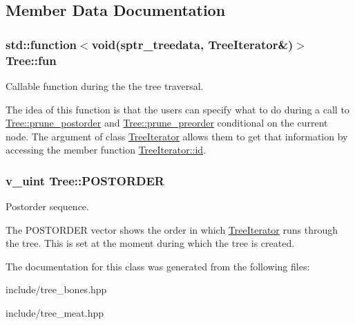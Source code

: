 \subsection{Member Data Documentation}
\subsubsection[{\texorpdfstring{fun}{fun}}]{\setlength{\rightskip}{0pt plus 5cm}std\+::function$<$void(sptr\+\_\+treedata, {\bf Tree\+Iterator}\&)$>$ Tree\+::fun}\hypertarget{classTree_ad98f51efc931f96c687c65d4387d19e9}{}\label{classTree_ad98f51efc931f96c687c65d4387d19e9}


Callable function during the the tree traversal. 

The idea of this function is that the users can specify what to do during a call to \hyperlink{classTree_a7d465880d18acf79f3a772ea5412b0d7}{Tree\+::prune\+\_\+postorder} and \hyperlink{classTree_ac85bfb083b3856e65987e1d15885a61c}{Tree\+::prune\+\_\+preorder} conditional on the current node. The argument of class \hyperlink{classTreeIterator}{Tree\+Iterator} allows them to get that information by accessing the member function \hyperlink{classTreeIterator_a80badcbb276e0aa78216f5ef6ff91b62}{Tree\+Iterator\+::id}. 
\subsubsection[{\texorpdfstring{P\+O\+S\+T\+O\+R\+D\+ER}{POSTORDER}}]{\setlength{\rightskip}{0pt plus 5cm}v\+\_\+uint Tree\+::\+P\+O\+S\+T\+O\+R\+D\+ER\hspace{0.3cm}{\ttfamily [protected]}}\hypertarget{classTree_a310e76b803db38e7067514822b21a58f}{}\label{classTree_a310e76b803db38e7067514822b21a58f}


Postorder sequence. 

The P\+O\+S\+T\+O\+R\+D\+ER vector shows the order in which \hyperlink{classTreeIterator}{Tree\+Iterator} runs through the tree. This is set at the moment during which the tree is created. 

The documentation for this class was generated from the following files\+:\begin{DoxyCompactItemize}
\item 
include/tree\+\_\+bones.\+hpp\item 
include/tree\+\_\+meat.\+hpp\end{DoxyCompactItemize}
